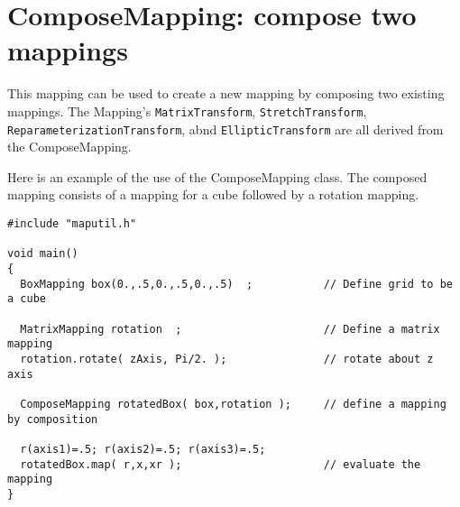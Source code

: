 \section{ComposeMapping: compose two mappings}

This mapping can be used to create a new mapping by composing
two existing mappings. The Mapping's {\tt MatrixTransform}, {\tt StretchTransform},
{\tt ReparameterizationTransform}, abnd {\tt EllipticTransform} are all derived
from the ComposeMapping.

% 
% 
% 
% 
% 
Here is an example of the use of the {\ff ComposeMapping} class.
The composed mapping consists of a mapping for a cube followed by
a rotation mapping.
{\footnotesize
\begin{verbatim}
#include "maputil.h"

void main()
{
  BoxMapping box(0.,.5,0.,.5,0.,.5)  ;           // Define grid to be a cube

  MatrixMapping rotation  ;                      // Define a matrix mapping 
  rotation.rotate( zAxis, Pi/2. );               // rotate about z axis
  
  ComposeMapping rotatedBox( box,rotation );     // define a mapping by composition

  r(axis1)=.5; r(axis2)=.5; r(axis3)=.5;
  rotatedBox.map( r,x,xr );                      // evaluate the mapping
}
\end{verbatim}
}
\noindent

